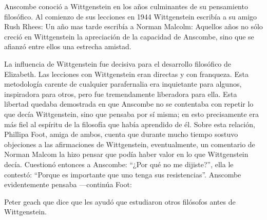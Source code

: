 Anscombe conoció a Wittgenstein en los años culminantes de su pensamiento filosófico. Al comienzo de sus lecciones en 1944 Wittgenstein escribía a su amigo Rush Rhees:  Un año mas tarde escribía a Norman Malcolm:  Aquellos años no sólo creció en Wittgenstein la apreciación de la capacidad de Anscombe, sino que se afianzó entre ellos una estrecha amistad.

La influencia de Wittgenstein fue decisiva para el desarrollo filosófico de Elizabeth. Las lecciones con Wittgenstein eran directas y con franqueza. Esta metodología carente de cualquier parafernalia era inquietante para algunos, inspiradora para otros, pero fue tremendamente liberadora para ella.\autocite[loc 9853 Chapter 4, Section 24, \S5]{monk} Esta libertad quedaba demostrada en que Anscombe no se contentaba con repetir lo que decía Wittgenstein, sino que pensaba por sí misma; en esto precisamente era más fiel al espíritu de la filosofía que había aprendido de él. Sobre esta relación, Phillipa Foot, amiga de ambos, cuenta que durante mucho tiempo sostuvo objeciones a las afirmaciones de Wittgenstein, eventualmente, un comentario de Norman Malcom la hizo pensar que podía haber valor en lo que Wittgenstein decía. Cuestionó entonces a Anscombe: ``¿Por qué no me dijiste?'', ella le contestó: ``Porque es importante que uno tenga sus resistencias''. Anscombe evidentemente pensaba ---continúa Foot: 

Peter geach que dice que les ayudó que estudiaron otros filósofos antes de Wittgenstein.
